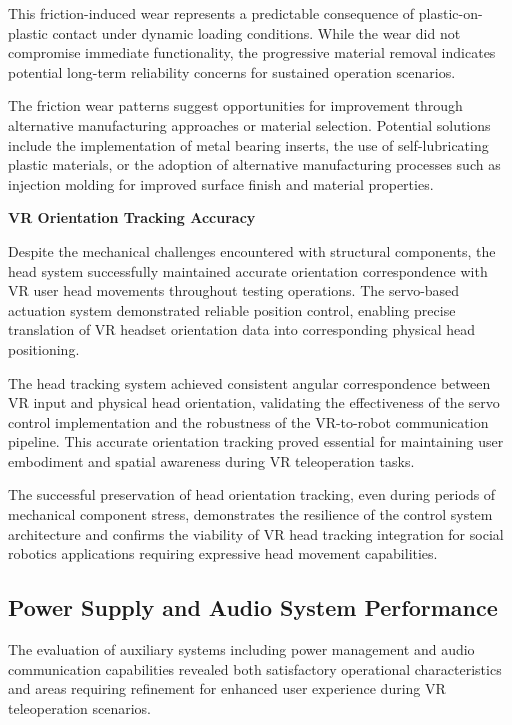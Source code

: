 This friction-induced wear represents a predictable consequence of plastic-on-plastic contact under dynamic loading conditions. While the wear did not compromise immediate functionality, the progressive material removal indicates potential long-term reliability concerns for sustained operation scenarios.

The friction wear patterns suggest opportunities for improvement through alternative manufacturing approaches or material selection. Potential solutions include the implementation of metal bearing inserts, the use of self-lubricating plastic materials, or the adoption of alternative manufacturing processes such as injection molding for improved surface finish and material properties.

\textbf{VR Orientation Tracking Accuracy}

Despite the mechanical challenges encountered with structural components, the head system successfully maintained accurate orientation correspondence with VR user head movements throughout testing operations. The servo-based actuation system demonstrated reliable position control, enabling precise translation of VR headset orientation data into corresponding physical head positioning.

The head tracking system achieved consistent angular correspondence between VR input and physical head orientation, validating the effectiveness of the servo control implementation and the robustness of the VR-to-robot communication pipeline. This accurate orientation tracking proved essential for maintaining user embodiment and spatial awareness during VR teleoperation tasks.

The successful preservation of head orientation tracking, even during periods of mechanical component stress, demonstrates the resilience of the control system architecture and confirms the viability of VR head tracking integration for social robotics applications requiring expressive head movement capabilities.

\subsection{Power Supply and Audio System Performance}

The evaluation of auxiliary systems including power management and audio communication capabilities revealed both satisfactory operational characteristics and areas requiring refinement for enhanced user experience during VR teleoperation scenarios.

